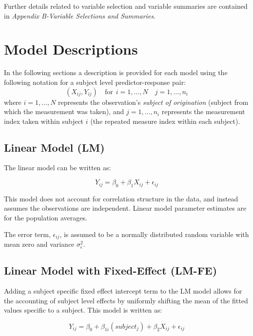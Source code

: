 \documentclass[12pt,]{article}
\begin{document}
Further details related to variable selection and variable summaries are
contained in \textit{Appendix B-Variable Selections and Summaries}.

\hypertarget{model-descriptions}{%
\section{Model Descriptions}\label{model-descriptions}}

In the following sections a description is provided for each model using
the following notation for a subject level predictor-response pair:
\[\left(X_{ij},Y_{ij} \right)  \quad \text{for} \ \ i=1,\ldots,N \quad j=1,\ldots,n_{i} \]
where \(i=1,\ldots,N\) represents the observation's
\textit{subject of origination} (subject from which the measurement was
taken), and \(j=1,\ldots,n_{i}\) represents the measurement index taken
within subject \(i\) (the repeated measure index within each subject).

\newpage

\hypertarget{linear-model-lm}{%
\subsection{Linear Model (LM)}\label{linear-model-lm}}

The linear model can be written as:

\[Y_{ij}=\beta_{0} + \beta_{1} X_{ij} + \epsilon_{ij}\]

This model does not account for correlation structure in the data, and
instead assumes the observations are independent. Linear model parameter
estimates are for the population averages.

The error term, \(\epsilon_{ij}\), is assumed to be a normally
distributed random variable with mean zero and variance
\(\sigma_{\epsilon}^{2}\).

\hypertarget{linear-model-with-fixed-effect-lm-fe}{%
\subsection{Linear Model with Fixed-Effect
(LM-FE)}\label{linear-model-with-fixed-effect-lm-fe}}

Adding a subject specific fixed effect intercept term to the LM model
allows for the accounting of subject level effects by uniformly shifting
the mean of the fitted values specific to a subject. This model is
written as:

\[Y_{ij} = \beta_{0} + \beta_{1i}(subject_{j})+\beta_{2} X_{ij} + \epsilon_{ij}\]
\end{document}
